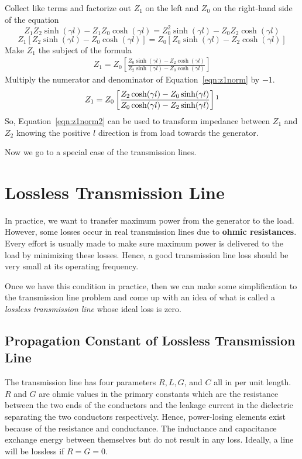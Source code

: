 Collect like terms and factorize out $Z_1$ on the left and $Z_0$ on the right-hand side of the equation
\begin{dmath*}
Z_1Z_2\sinh(\gamma l) - Z_1Z_0\cosh(\gamma l) = Z_0^2\sinh(\gamma l) - Z_0Z_2\cosh(\gamma l)
\end{dmath*}
\begin{dmath*}
Z_1\left[Z_2\sinh(\gamma l) - Z_0\cosh(\gamma l)\right] = Z_0\left[Z_0\sinh(\gamma l) - Z_2\cosh(\gamma l)\right]
\end{dmath*}
Make $Z_1$ the subject of the formula
\begin{align}
Z_1 = Z_0\left[\frac{Z_0\sinh(\gamma l) - Z_2\cosh(\gamma l)}{Z_2\sinh(\gamma l) - Z_0\cosh(\gamma l)}\right]
\label{eqn:z1norm}
\end{align}
Multiply the numerator and denominator of Equation~\eqref{eqn:z1norm} by $-1$.
\begin{equation}
Z_1 = Z_0\left[\frac{Z_2\cosh(\gamma l) - Z_0\sinh(\gamma l)}{Z_0\cosh(\gamma l) - Z_2\sinh(\gamma l)}\right]\footnotemark
\label{eqn:z1norm2}
\end{equation}
So, Equation~\eqref{eqn:z1norm2} can be used to transform impedance between $Z_1$ and $Z_2$ knowing the positive $l$ direction is from load towards the generator.

Now we go to a special case of the transmission lines.

\section{Lossless Transmission Line}
In practice, we want to transfer maximum power from the generator to the load. However, some losses occur in real transmission lines due to \textbf{ohmic resistances}. Every effort is usually made to make sure maximum power is delivered to the load by minimizing these losses. Hence, a good transmission line loss should be very small at its operating frequency.

Once we have this condition in practice, then we can make some simplification to the transmission line problem and come up with an idea of what is called a \emph{lossless transmission line} whose ideal loss is zero.

\subsection{Propagation Constant of Lossless Transmission Line}
The transmission line has four parameters $R, L, G$, and $C$ all in per unit length. $R$ and $G$ are ohmic values in the primary constants which are the resistance between the two ends of the conductors and the leakage current in the dielectric separating the two conductors respectively. Hence, power-losing elements exist because of the resistance and conductance. The inductance and capacitance exchange energy between themselves but do not result in any loss. Ideally, a line will be lossless if $R = G = 0$.

